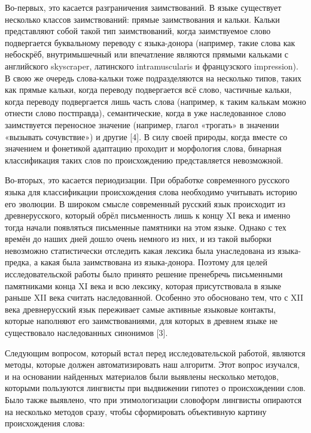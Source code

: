 Во-первых, это касается разграничения заимствований. В языке существует несколько классов заимствований: прямые заимствования и кальки. Кальки представляют собой такой тип заимствований, когда заимствуемое слово подвергается буквальному переводу с языка-донора (например, такие слова как \textquotesingle\textquotesingle небоскрёб\textquotesingle\textquotesingle, \textquotesingle\textquotesingle внутримышечный\textquotesingle\textquotesingle{} или \textquotesingle\textquotesingle впечатление\textquotesingle\textquotesingle{} являются прямыми кальками с английского \textquotesingle\textquotesingle skyscraper\textquotesingle\textquotesingle, латинского \textquotesingle\textquotesingle intramuscularis\textquotesingle\textquotesingle{} и французского \textquotesingle\textquotesingle impression\textquotesingle\textquotesingle). В свою же очередь слова-кальки тоже подразделяются на несколько типов, таких как прямые кальки, когда переводу подвергается всё слово, частичные кальки, когда переводу подвергается лишь часть слова (например, к таким калькам можно отнести слово \textquotesingle\textquotesingle постправда\textquotesingle\textquotesingle), семантические, когда в уже наследованное слово заимствуется переносное значение (например, глагол «трогать» в значении «вызывать сочувствие») и другие {[}4{]}. В силу своей природы, когда вместе со значением и фонетикой адаптацию проходит и морфология слова, бинарная классификация таких слов по происхождению представляется невозможной.

Во-вторых, это касается периодизации. При обработке современного русского языка для классификации происхождения слова необходимо учитывать историю его эволюции. В широком смысле современный русский язык происходит из древнерусского, который обрёл письменность лишь к концу XI века и именно тогда начали появляться письменные памятники на этом языке. Однако с тех времён до наших дней дошло очень немного из них, и из такой выборки невозможно статистически отследить какая лексика была унаследована из языка-предка, а какая была заимствована из языка-донора. Поэтому для целей исследовательской работы было принято решение пренебречь письменными памятниками конца XI века и всю лексику, которая присутствовала в языке раньше XII века считать наследованной. Особенно это обосновано тем, что с XII века древнерусский язык переживает самые активные языковые контакты, которые наполняют его заимствованиями, для которых в древнем языке не существовало наследованных синонимов {[}3{]}.

Следующим вопросом, который встал перед исследовательской работой, являются методы, которые должен автоматизировать наш алгоритм. Этот вопрос изучался, и на основании найденных материалов были выявлены несколько методов, которыми пользуются лингвисты при выдвижении гипотез о происхождении слов. Было также выявлено, что при этимологизации словоформ лингвисты опираются на несколько методов сразу, чтобы сформировать объективную картину происхождения слова:

